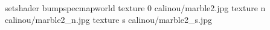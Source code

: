 setshader bumpspecmapworld
texture 0 calinou/marble2.jpg
texture n calinou/marble2_n.jpg
texture s calinou/marble2_s.jpg
